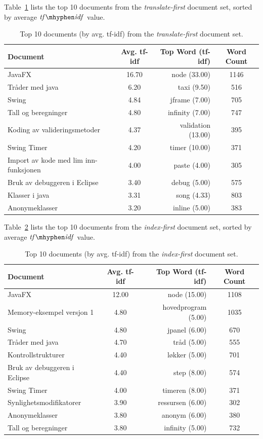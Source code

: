 \documentclass[a4paper]{book}
\newcommand\tfidf{\mathit{tf\mhyphen idf}}
\begin{document}
Table~\ref{tab:highestRankedDocuments-en} lists the top 10 documents from the \textit{translate-first} document set, sorted by average $\tfidf$ value.
\begin{table}[H]
\centering
\begin{tabular}{|l|c|r|c|}
\hline\hline
    Document & Avg. tf-idf & Top Word (tf-idf) & Word Count \\
\hline
    JavaFX & 16.70 & node (33.00) & 1146 \\
    Tråder med java & 6.20 & taxi (9.50) & 516 \\
    Swing & 4.84 & jframe (7.00) & 705 \\
    Tall og beregninger & 4.80 & infinity (7.00) & 747 \\
    Koding av valideringsmetoder & 4.37 & validation (13.00) & 395 \\
    Swing Timer & 4.20 & timer (10.00) & 371 \\
    Import av kode med lim inn-funksjonen & 4.00 & paste (4.00) & 305 \\
    Bruk av debuggeren i Eclipse & 3.40 & debug (5.00) & 575 \\
    Klasser i java & 3.31 & song (4.33) & 803 \\
    Anonymeklasser & 3.20 & inline (5.00) & 383 \\
\hline\hline
\end{tabular}
\caption{Top 10 documents (by avg. tf-idf) from the \textit{translate-first} document set.}
\label{tab:highestRankedDocuments-en}
\end{table}

Table~\ref{tab:highestRankedDocuments-no} lists the top 10 documents from the \textit{index-first} document set, sorted by average $\tfidf$ value.
\begin{table}[H]
\centering
\begin{tabular}{|l|c|r|c|}
\hline\hline
    Document & Avg. tf-idf & Top Word (tf-idf) & Word Count \\
\hline
    JavaFX & 12.00 & node (15.00) & 1108 \\
    Memory-eksempel versjon 1 & 4.80 & hovedprogram (5.00) & 1035 \\
    Swing & 4.80 & jpanel (6.00) & 670 \\
    Tråder med java & 4.70 & tråd (5.00) & 555 \\
    Kontrollstrukturer & 4.40 & løkker (5.00) & 701 \\
    Bruk av debuggeren i Eclipse & 4.40 & step (8.00) & 574 \\
    Swing Timer & 4.00 & timeren (8.00) & 371 \\
    Synlighetsmodifikatorer & 3.90 & ressursen (6.00) & 302 \\
    Anonymeklasser & 3.80 & anonym (6.00) & 380 \\
    Tall og beregninger & 3.80 & infinity (5.00) & 732 \\
\hline\hline
\end{tabular}
\caption{Top 10 documents (by avg. tf-idf) from the \textit{index-first} document set.}
\label{tab:highestRankedDocuments-no}
\end{table}
\end{document}
